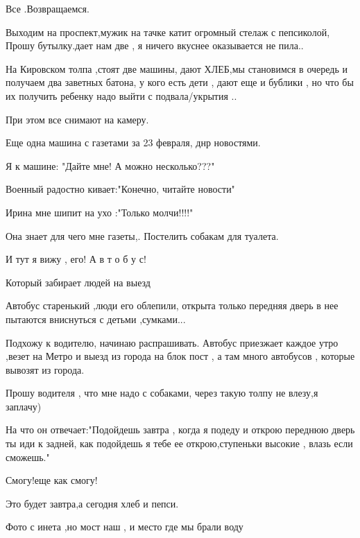 Все .Возвращаемся.

Выходим на проспект,мужик на тачке катит огромный стелаж с пепсиколой, Прошу
бутылку.дает нам две , я ничего вкуснее оказывается не пила..

На Кировском  толпа ,стоят две машины, дают ХЛЕБ,мы становимся в очередь и
получаем два заветных батона, у кого есть дети , дают еще и бублики , но что бы
их получить ребенку надо выйти с подвала/укрытия ..

При этом все снимают на камеру.

Еще одна машина с газетами за 23 февраля, днр новостями.  

Я к машине: "Дайте мне! А можно несколько???"

Военный радостно кивает:"Конечно, читайте новости"

Ирина мне шипит на ухо :"Только  молчи!!!!"

Она знает для чего мне газеты,.  Постелить собакам для туалета.

И тут я вижу , его! А в т о б у с! 

Который забирает людей на выезд

Автобус старенький ,люди его облепили, открыта только передняя дверь в нее
пытаются вниснуться с детьми ,сумками...

Подхожу к водителю, начинаю распрашивать. Автобус приезжает каждое утро ,везет
на Метро и выезд из города на блок пост , а там  много автобусов , которые
вывозят из города.

Прошу водителя , что мне надо с собаками, через такую толпу не влезу,я заплачу)

На что он отвечает:"Подойдешь завтра , когда я подеду и открою переднюю дверь
ты иди к задней,  как подойдешь я тебе ее открою,ступеньки высокие , влазь если
сможешь."

Смогу!еще как смогу!

Это будет завтра,а сегодня хлеб и пепси.

Фото с инета ,но мост наш , и место где мы брали воду

